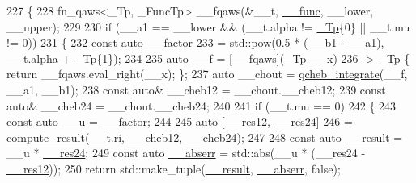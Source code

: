 \begin{DoxyCode}
227     \{
228       fn\_qaws<\_Tp, \_FuncTp> \_\_fqaws(&\_\_t, \hyperlink{namespace____gnu__cxx_af2b2f0c7a2ae72b922b1afefae5a65b2}{\_\_func}, \_\_lower, \_\_upper);
229 
230       \textcolor{keywordflow}{if} (\_\_a1 == \_\_lower && (\_\_t.alpha != \hyperlink{namespace____gnu__cxx_a3b19a9c800ca194374ef9172290f7d79}{\_Tp}\{0\} || \_\_t.mu != 0))
231         \{
232           \textcolor{keyword}{const} \textcolor{keyword}{auto} \_\_factor
233             = std::pow(0.5 * (\_\_b1 - \_\_a1), \_\_t.alpha + \hyperlink{namespace____gnu__cxx_a3b19a9c800ca194374ef9172290f7d79}{\_Tp}\{1\});
234 
235           \textcolor{keyword}{auto} \_\_f = [\_\_fqaws](\hyperlink{namespace____gnu__cxx_a3b19a9c800ca194374ef9172290f7d79}{\_Tp} \_\_x)
236                      -> \hyperlink{namespace____gnu__cxx_a3b19a9c800ca194374ef9172290f7d79}{\_Tp} \{ \textcolor{keywordflow}{return} \_\_fqaws.eval\_right(\_\_x); \};
237           \textcolor{keyword}{auto} \_\_chout = \hyperlink{namespace____gnu__cxx_aa8e32fefb92558e0c8ddb94c25fd637b}{qcheb\_integrate}(\_\_f, \_\_a1, \_\_b1);
238           \textcolor{keyword}{const} \textcolor{keyword}{auto}& \_\_cheb12 = \_\_chout.\_\_cheb12;
239           \textcolor{keyword}{const} \textcolor{keyword}{auto}& \_\_cheb24 = \_\_chout.\_\_cheb24;
240 
241           \textcolor{keywordflow}{if} (\_\_t.mu == 0)
242             \{
243               \textcolor{keyword}{const} \textcolor{keyword}{auto} \_\_u = \_\_factor;
244 
245               \textcolor{keyword}{auto} [\hyperlink{namespace____gnu__cxx_a6ea2384a750bf3ec4778454ae3b4b5c3}{\_\_res12}, \hyperlink{namespace____gnu__cxx_af9fb40bd2c7cde535117200af946d670}{\_\_res24}]
246                 = \hyperlink{namespace____gnu__cxx_a10e06852570922cdc1aca86883b5161e}{compute\_result}(\_\_t.ri, \_\_cheb12, \_\_cheb24);
247 
248               \textcolor{keyword}{const} \textcolor{keyword}{auto} \hyperlink{namespace____gnu__cxx_a500ea9f53aeaecd8c2ae657503450578}{\_\_result} = \_\_u * \hyperlink{namespace____gnu__cxx_af9fb40bd2c7cde535117200af946d670}{\_\_res24};
249               \textcolor{keyword}{const} \textcolor{keyword}{auto} \hyperlink{namespace____gnu__cxx_a72f736cff127f1574e91a301de9e074b}{\_\_abserr} = std::abs(\_\_u * (\_\_res24 - \hyperlink{namespace____gnu__cxx_a6ea2384a750bf3ec4778454ae3b4b5c3}{\_\_res12}));
250               \textcolor{keywordflow}{return} std::make\_tuple(\hyperlink{namespace____gnu__cxx_a500ea9f53aeaecd8c2ae657503450578}{\_\_result}, \hyperlink{namespace____gnu__cxx_a72f736cff127f1574e91a301de9e074b}{\_\_abserr}, \textcolor{keyword}{false});

\end{DoxyCode}
